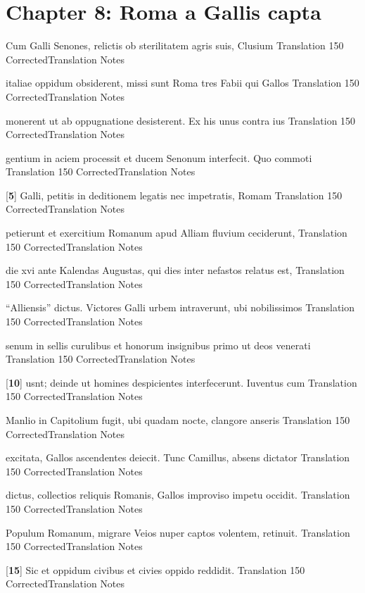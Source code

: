 \chapter*{Chapter 8:  Roma a Gallis capta} %
\label{sec:chapter_8}

\latline
  {Cum Galli Senones, relictis ob sterilitatem agris suis, Clusium}
  { Translation }
  {150}
  { CorrectedTranslation }
  { Notes }


\latline
  {italiae oppidum obsiderent, missi sunt Roma tres Fabii qui Gallos}
  { Translation }
  {150}
  { CorrectedTranslation }
  { Notes }


\latline
  {monerent ut ab oppugnatione desisterent.  Ex his unus contra ius}
  { Translation }
  {150}
  { CorrectedTranslation }
  { Notes }


\latline
  {gentium in aciem processit et ducem Senonum interfecit.  Quo commoti }
  { Translation }
  {150}
  { CorrectedTranslation }
  { Notes }


\latline
  {[\textbf{5}] Galli, petitis in deditionem legatis nec impetratis, Romam}
  { Translation }
  {150}
  { CorrectedTranslation }
  { Notes }


\latline
  {petierunt et exercitium Romanum apud Alliam fluvium ceciderunt,}
  { Translation }
  {150}
  { CorrectedTranslation }
  { Notes }


\latline
  {die xvi ante Kalendas Augustas, qui dies inter nefastos relatus est,}
  { Translation }
  {150}
  { CorrectedTranslation }
  { Notes }


\latline
  {``Alliensis'' dictus.  Victores Galli urbem intraverunt, ubi nobilissimos}
  { Translation }
  {150}
  { CorrectedTranslation }
  { Notes }


\latline
  {senum in sellis curulibus et honorum insignibus primo ut deos venerati}
  { Translation }
  {150}
  { CorrectedTranslation }
  { Notes }


\latline
  {[\textbf{10}] usnt; deinde ut homines despicientes interfecerunt.  Iuventus cum}
  { Translation }
  {150}
  { CorrectedTranslation }
  { Notes }


\latline
  {Manlio in Capitolium fugit, ubi quadam nocte, clangore anseris}
  { Translation }
  {150}
  { CorrectedTranslation }
  { Notes }


\latline
  {excitata, Gallos ascendentes deiecit.  Tunc Camillus, absens dictator}
  { Translation }
  {150}
  { CorrectedTranslation }
  { Notes }


\latline
  {dictus, collectios reliquis Romanis, Gallos improviso impetu occidit.}
  { Translation }
  {150}
  { CorrectedTranslation }
  { Notes }


\latline
  {Populum Romanum, migrare Veios nuper captos volentem, retinuit.}
  { Translation }
  {150}
  { CorrectedTranslation }
  { Notes }


\latline
  {[\textbf{15}] Sic et oppidum civibus et civies oppido reddidit.}
  { Translation }
  {150}
  { CorrectedTranslation }
  { Notes }


